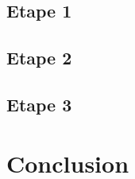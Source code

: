 \documentclass[a4paper]{article}
\begin{document}
    \subsection{Etape 1}
    \subsection{Etape 2}
    \subsection{Etape 3}
    
\section{Conclusion} %
 \begin{lstlisting}[style=CStyle]
    
\end{lstlisting}

\newpage %
\end{document}
